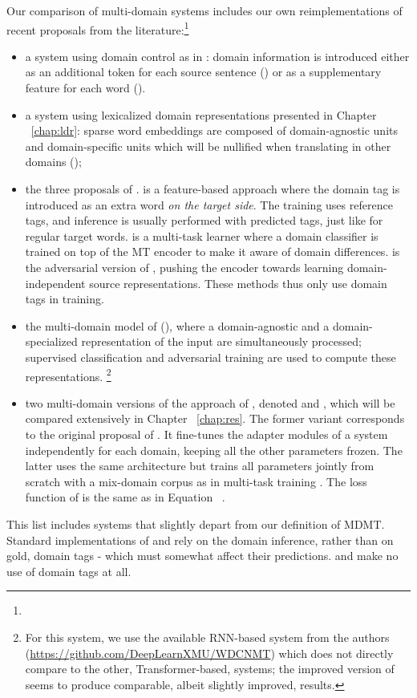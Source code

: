Our comparison of multi-domain systems includes our own reimplementations of recent proposals from the literature:\footnote{}
\begin{itemize}
\item a system using domain control as in \citet{Kobus17domain}: domain information is introduced either as an additional token for each source sentence () or as a supplementary feature for each word ().
\item a system using lexicalized domain representations presented in Chapter ~\ref{chap:ldr}: sparse word embeddings are composed of domain-agnostic units and domain-specific units which will be nullified when translating in other domains ();
\item the three proposals of \citet{Britz17effective}.  is a feature-based approach where the domain tag is introduced as an extra word \textsl{on the target side}. The training uses reference tags, and inference is usually performed with predicted tags, just like for regular target words.  is a multi-task learner where a domain classifier is trained on top of the MT encoder to make it aware of domain differences.  is the adversarial version of , pushing the encoder towards learning domain-independent source representations. These methods thus only use domain tags in training.
\item the multi-domain model of \citet{Zeng18multidomain} (), where a domain-agnostic and a domain-specialized representation of the input are simultaneously processed; supervised classification and adversarial training are used to compute these representations. \footnote{For this system, we use the available RNN-based system from the authors (\url{https://github.com/DeepLearnXMU/WDCNMT}) which does not directly compare to the other, Transformer-based, systems; the improved version of \citet{Su19exploring} seems to produce comparable, albeit slightly improved, results.}
\item two multi-domain versions of the approach of \citet{Bapna19simple}, denoted  and , which will be compared extensively in Chapter ~\ref{chap:res}. The former variant corresponds to the original proposal of \citet{Bapna19simple} . It fine-tunes the adapter modules of a  system independently for each domain, keeping all the other parameters frozen. The latter uses the same architecture but trains all parameters jointly from scratch with a mix-domain corpus as in multi-task training \citep{Caruana97multitask}. The loss function of  is the same as in Equation ~.
\end{itemize}
This list includes systems that slightly depart from our definition of MDMT. Standard implementations of  and  rely on the domain inference, rather than on gold, domain tags - which must somewhat affect their predictions.  and  make no use of domain tags at all. 
